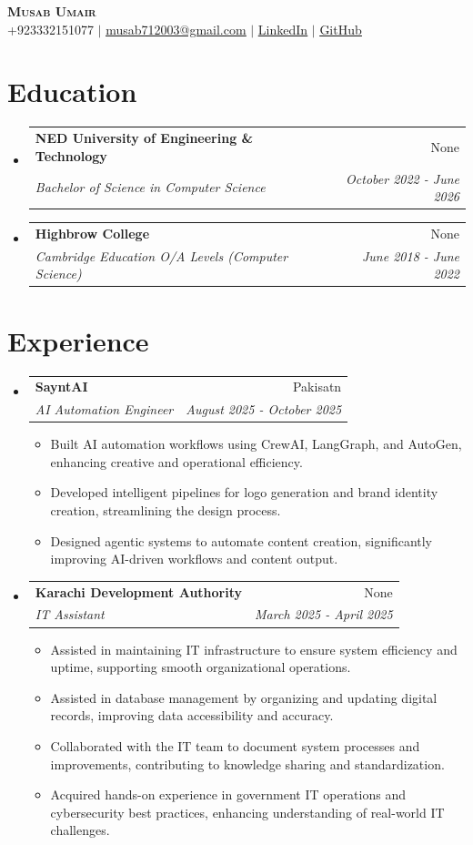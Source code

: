 \documentclass[letterpaper,11pt]{article}
\makeatletter
\newcommand{\resumeItem}[1]{
  \item\small{
    {#1 \vspace{-2pt}}
  }
}
\newcommand{\resumeSubheading}[4]{
  \vspace{-2pt}\item
    \begin{tabular*}{0.97\textwidth}[t]{l@{\extracolsep{\fill}}r}
      \textbf{#1} & #2 \\
      \textit{\small#3} & \textit{\small #4} \\
    \end{tabular*}\vspace{-7pt}
}
\newcommand{\resumeSubHeadingListStart}{\begin{itemize}[leftmargin=0.15in, label={}]}
\newcommand{\resumeSubHeadingListEnd}{\end{itemize}}
\newcommand{\resumeItemListStart}{\begin{itemize}}
\newcommand{\resumeItemListEnd}{\end{itemize}\vspace{-5pt}}
\makeatother
\begin{document}
\begin{center}
    \textbf{\Huge \scshape Musab Umair} \\ \vspace{1pt}
    \small +923332151077 $|$ \href{mailto:musab712003@gmail.com}{\underline{musab712003@gmail.com}} $|$ 
    \href{https://www.linkedin.com/in/musab-umair1}{\underline{LinkedIn}} $|$
    \href{https://github.com/Musab712}{\underline{GitHub}}
\end{center}


\section{Education}
  \resumeSubHeadingListStart
        \resumeSubheading
      {NED University of Engineering \& Technology}{None}
      {Bachelor of Science in Computer Science}{October 2022 - June 2026}
        \resumeSubheading
      {Highbrow College}{None}
      {Cambridge Education O/A Levels (Computer Science)}{June 2018 - June 2022}
      \resumeSubHeadingListEnd


\section{Experience}
  \resumeSubHeadingListStart
        \resumeSubheading
      {SayntAI}{Pakisatn}
      {AI Automation Engineer}{August 2025 - October 2025}
      \resumeItemListStart
                \resumeItem{Built AI automation workflows using CrewAI, LangGraph, and AutoGen, enhancing creative and operational efficiency.}
                \resumeItem{Developed intelligent pipelines for logo generation and brand identity creation, streamlining the design process.}
                \resumeItem{Designed agentic systems to automate content creation, significantly improving AI-driven workflows and content output.}
              \resumeItemListEnd
        \resumeSubheading
      {Karachi Development Authority}{None}
      {IT Assistant}{March 2025 - April 2025}
      \resumeItemListStart
                \resumeItem{Assisted in maintaining IT infrastructure to ensure system efficiency and uptime, supporting smooth organizational operations.}
                \resumeItem{Assisted in database management by organizing and updating digital records, improving data accessibility and accuracy.}
                \resumeItem{Collaborated with the IT team to document system processes and improvements, contributing to knowledge sharing and standardization.}
                \resumeItem{Acquired hands-on experience in government IT operations and cybersecurity best practices, enhancing understanding of real-world IT challenges.}
              \resumeItemListEnd
      \resumeSubHeadingListEnd
\end{document}
